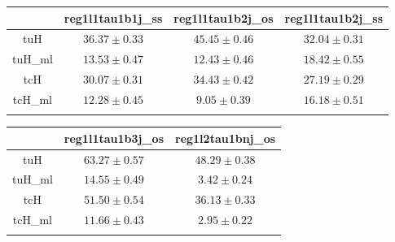 
\centering
\begin{tabular}{cccc} \toprule\toprule
 & reg1l1tau1b1j\_ss & reg1l1tau1b2j\_os & reg1l1tau1b2j\_ss\\\midrule
tuH & $36.37\pm0.33$ & $45.45\pm0.46$ & $32.04\pm0.31$\\
tuH\_ml & $13.53\pm0.47$ & $12.43\pm0.46$ & $18.42\pm0.55$\\
tcH & $30.07\pm0.31$ & $34.43\pm0.42$ & $27.19\pm0.29$\\
tcH\_ml & $12.28\pm0.45$ & $9.05\pm0.39$ & $16.18\pm0.51$\\
\bottomrule\bottomrule\\
\end{tabular}
\begin{tabular}{ccc} \toprule\toprule
 & reg1l1tau1b3j\_os & reg1l2tau1bnj\_os\\\midrule
tuH & $63.27\pm0.57$ & $48.29\pm0.38$\\
tuH\_ml & $14.55\pm0.49$ & $3.42\pm0.24$\\
tcH & $51.50\pm0.54$ & $36.13\pm0.33$\\
tcH\_ml & $11.66\pm0.43$ & $2.95\pm0.22$\\
\bottomrule\bottomrule\\
\end{tabular}